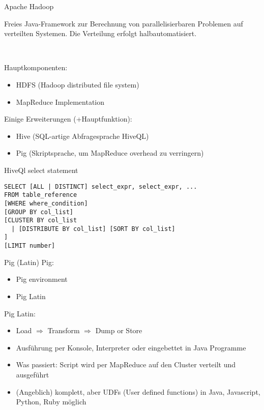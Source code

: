 \documentclass{beamer}
\begin{document}
\begin{frame}{Apache Hadoop}
	\begin{block}{}
		Freies Java-Framework zur Berechnung von parallelisierbaren Problemen auf verteilten Systemen. 
		Die Verteilung erfolgt halbautomatisiert.
	\end{block}		
	\quad \\
	\uncover<2-3> {
	Hauptkomponenten:
	\begin{itemize}
		\item HDFS (Hadoop distributed file system)
		\item MapReduce Implementation
	\end{itemize} 
	}

	 {
	Einige Erweiterungen (+Hauptfunktion):
	\begin{itemize}
		\item Hive (SQL-artige Abfragesprache HiveQL)
		\item Pig (Skriptsprache, um MapReduce overhead zu verringern)
	\end{itemize}
	}
\end{frame}

\begin{frame}[fragile]{HiveQl select statement}
\begin{lstlisting}  
SELECT [ALL | DISTINCT] select_expr, select_expr, ...
FROM table_reference
[WHERE where_condition]
[GROUP BY col_list]
[CLUSTER BY col_list
  | [DISTRIBUTE BY col_list] [SORT BY col_list]
]
[LIMIT number]
\end{lstlisting}
\end{frame}

\begin{frame}{Pig (Latin)}
Pig:
\begin{itemize}
	\item Pig environment
	\item Pig Latin
\end{itemize}

Pig Latin:
\begin{itemize}
	\item Load \(\Rightarrow\) Transform \(\Rightarrow\) Dump or Store
	\item Ausführung per Konsole, Interpreter oder eingebettet in Java Programme
	\item Was passiert: Script wird per MapReduce auf den Cluster verteilt und ausgeführt 
	\item (Angeblich) komplett, aber UDFs (User defined functions) in Java, Javascript, Python, Ruby möglich
\end{itemize}
\end{frame}
\end{document}
